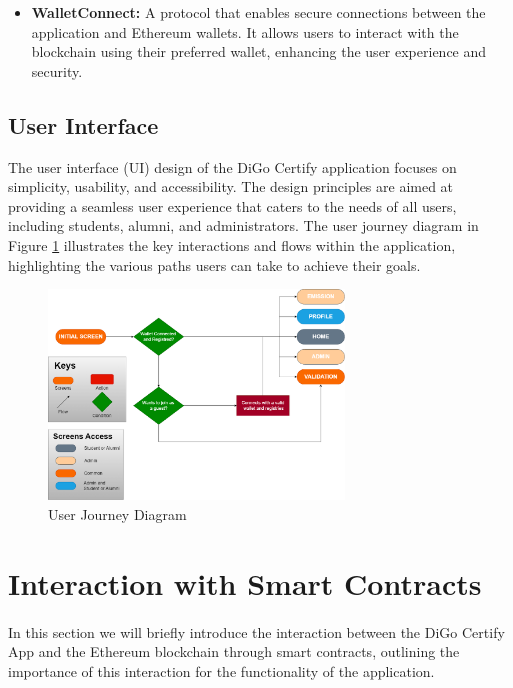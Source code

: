 \begin{itemize}
    \item \textbf{WalletConnect:} A protocol that enables secure connections between the application and Ethereum wallets. It allows users to interact with the blockchain using their preferred wallet, enhancing the user experience and security.
\end{itemize}

\subsection{User Interface}

The user interface (UI) design of the DiGo Certify application focuses on simplicity, usability, and accessibility. The design principles are aimed at providing a seamless user experience that caters to the needs of all users, including students, alumni, and administrators.
The user journey diagram in Figure \ref{fig:user-journey} illustrates the key interactions and flows within the application, highlighting the various paths users can take to achieve their goals.

\begin{figure}[H]
    \centering
    \includegraphics[width=0.7\textwidth]{final-report/assets/app-flow.drawio.png}
    \caption{User Journey Diagram}
    \label{fig:user-journey}
\end{figure}

\section{Interaction with Smart Contracts}\label{sec:interaction-with-smart-contracts}
\paragraph{}

In this section we will briefly introduce the interaction between the DiGo Certify App and the Ethereum blockchain through smart contracts, outlining the importance of this interaction for the functionality of the application.

